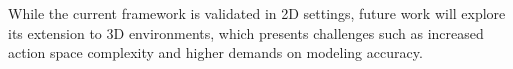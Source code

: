\documentclass[letterpaper, 10 pt, conference]{ieeeconf}  %
\begin{document}
While the current framework is validated in 2D settings, future work will explore its extension to 3D environments, which presents challenges such as increased action space complexity and higher demands on modeling accuracy.

\addtolength{\textheight}{0cm}   %












\end{document}
